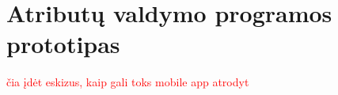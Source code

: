 \section{Atributų valdymo programos prototipas}
\label{appendix:attributeManagementApp}

\textcolor{red}{čia įdėt eskizus, kaip gali toks mobile app atrodyt}